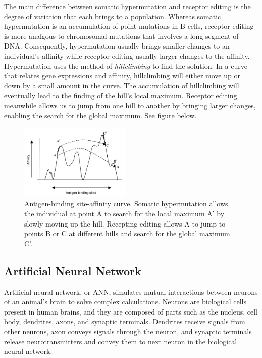\documentclass[]{interact}
\theoremstyle{plain} %
\theoremstyle{definition}
\theoremstyle{remark}
\begin{document}
The main difference between somatic hypermutation and receptor editing is the degree of variation that each brings to a population. Whereas somatic hypermutation is an accumulation of point mutations in B cells, receptor editing is more analgous to chromosomal mutations that involves a long segment of DNA. Consequently, hypermutation usually brings smaller changes to an individual's affinity while receptor editing usually larger changes to the affinity. Hypermutation uses the method of \textit{hillclimbing} to find the solution. In a curve that relates gene expressions and affinity, hillclimbing will either move up or down by a small amount in the curve. The accumulation of hillclimbing will eventually lead to the finding of the hill's local maximum. Receptor editing meanwhile allows us to jump from one hill to another by bringing larger changes, enabling the search for the global maximum. See figure below.

\begin{figure}[H]
    \centering
    \includegraphics[width=200px]{img/affinity-curve.png}
    \caption{Antigen-binding site-affinity curve. Somatic hypermutation allows the individual at point A to search for the local maximum A' by slowly moving up the hill. Recepting editing allows A to jump to points B or C at different hills and search for the global maximum C'. \cite{Cas01}}
    \label{fig:affinity}
\end{figure}

\subsection{Artificial Neural Network}
Artificial neural network, or ANN, simulates mutual interactions between neurons of an animal's brain to solve complex calculations. Neurons are biological cells present in human brains, and they are composed of parts such as the nucleus, cell body, dendrites, axons, and synaptic terminals. Dendrites receive signals from other neurons, axon conveys signals through the neuron, and synaptic terminals release neurotransmitters and convey them to next neuron in the biological neural network. 
\end{document}
